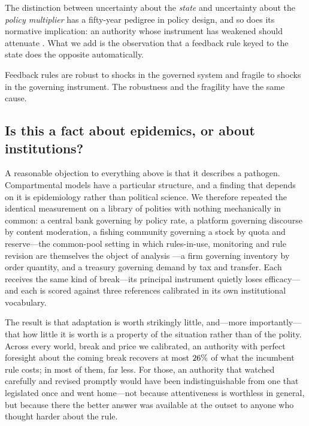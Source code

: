 \documentclass[11pt]{article}
\begin{document}
The distinction between uncertainty about the \emph{state} and uncertainty about the \emph{policy
multiplier} has a fifty-year pedigree in policy design, and so does its normative implication: an
authority whose instrument has weakened should attenuate \citep{brainard1967uncertainty}. What we add
is the observation that a feedback rule keyed to the state does the opposite automatically.

\begin{takeaway}
Feedback rules are robust to shocks in the governed system and fragile to shocks in the governing
instrument. The robustness and the fragility have the same cause.
\end{takeaway}

\subsection{Is this a fact about epidemics, or about institutions?}
\label{sec:library-social}

A reasonable objection to everything above is that it describes a pathogen. Compartmental models have
a particular structure, and a finding that depends on it is epidemiology rather than political
science. We therefore repeated the identical measurement on a library of polities with nothing
mechanically in common: a central bank governing by policy rate, a platform governing discourse by
content moderation, a fishing community governing a stock by quota and reserve---the common-pool setting in which
rules-in-use, monitoring and rule revision are themselves the object of analysis
\citep{ostrom1990governing}---a firm governing
inventory by order quantity, and a treasury governing demand by tax and transfer. Each receives the
same kind of break---its principal instrument quietly loses efficacy---and each is scored against
three references calibrated in its own institutional vocabulary.



The result is that adaptation is worth strikingly little, and---more importantly---that how little
it is worth is a property of the situation rather than of the polity. Across every world, break and
price we calibrated, an authority with perfect foresight about the coming break recovers at most
$26\%$ of what the incumbent rule costs; in most of them, far less. For those, an
authority that watched carefully and revised promptly would have been indistinguishable from one that
legislated once and went home---not because attentiveness is worthless in general, but because there
the better answer was available at the outset to anyone who thought harder about the rule.
\end{document}
